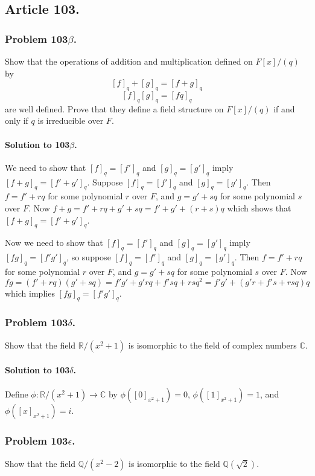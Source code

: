 \subsection{Article 103.}

\subsubsection{Problem 103$\beta$.}
Show that the operations of addition and multiplication defined on $F[x]/(q)$
by
$$[f]_q + [g]_q = [f+g]_q$$
$$[f]_q [g]_q = [fq]_q$$
are well defined. Prove that they define a field structure on $F[x]/(q)$ if
and only if $q$ is irreducible over $F$.

\paragraph*{Solution to 103$\beta$.}

We need to show that $[f]_q = [f']_q$ and $[g]_q = [g']_q$ imply
$[f+g]_q = [f'+g']_q$. Suppose $[f]_q = [f']_q$ and $[g]_q = [g']_q$. Then
$f = f' + rq$ for some polynomial $r$ over $F$, and $g = g' + sq$ for some
polynomial $s$ over $F$. Now $f + g = f' + rq + g' + sq = f' + g' + (r + s)q$
which shows that $[f+g]_q = [f'+g']_q$.

Now we need to show that $[f]_q = [f']_q$ and $[g]_q = [g']_q$ imply
$[fg]_q = [f'g']_q$, so suppose $[f]_q = [f']_q$ and $[g]_q = [g']_q$. Then
$f = f' + rq$ for some polynomial $r$ over $F$, and $g = g' + sq$ for some
polynomial $s$ over $F$. Now $fg = (f'+rq)(g'+sq) = f'g' + g'rq + f'sq + rsq^2
= f'g' + (g'r + f's + rsq) q$ which implies $[fg]_q = [f'g']_q$.

\subsubsection{Problem 103$\delta$.}
Show that the field $\mathbb{R}/(x^2+1)$ is isomorphic to the field of complex
numbers $\mathbb{C}$.

\paragraph*{Solution to 103$\delta$.}
Define $\phi: \mathbb{R}/(x^2+1) \rightarrow \mathbb{C}$ by
$\phi([0]_{x^2+1}) = 0$, $\phi([1]_{x^2+1}) = 1$, and $\phi([x]_{x^2+1}) = i$.

\subsubsection{Problem 103$\epsilon$.}
Show that the field $\mathbb{Q}/(x^2-2)$ is isomorphic to the field
$\mathbb{Q}(\sqrt{2})$.

